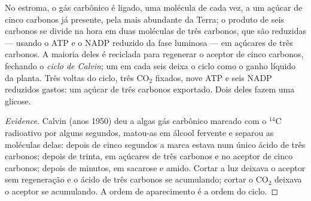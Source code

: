 \begin{proposition}\label{prop:g12:photosynthesis:calvin}
No estroma, o gás carbônico é ligado, uma molécula de cada vez, a um
açúcar de cinco carbonos já presente, pela  mais abundante da
Terra; o produto de seis carbonos se divide na hora em duas moléculas
de três carbonos, que são reduzidas --- usando o ATP e o NADP reduzido
da fase luminosa --- em açúcares de três carbonos. A maioria deles é
reciclada para regenerar o aceptor de cinco carbonos, fechando o
\emph{ciclo de Calvin}; um em cada seis deixa o
ciclo como o ganho líquido da planta. Três voltas do ciclo, três
$\mathrm{CO_2}$ fixados, nove ATP e seis NADP reduzidos gastos: um
açúcar de três carbonos exportado. Dois deles fazem uma glicose.
\end{proposition}
\begin{proof}[Evidence]
Calvin (anos 1950) deu a algas gás carbônico marcado com o $^{14}$C
radioativo por alguns segundos, matou-as em álcool fervente e separou
as moléculas delas: depois de cinco segundos a marca estava num único
ácido de três carbonos; depois de trinta, em açúcares de três carbonos
e no aceptor de cinco carbonos; depois de minutos, em sacarose e amido.
Cortar a luz deixava o aceptor sem regeneração e o ácido de três
carbonos se acumulando; cortar o $\mathrm{CO_2}$ deixava o aceptor se
acumulando. A ordem de aparecimento é a ordem do ciclo.
\end{proof}

